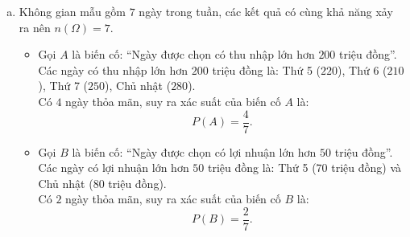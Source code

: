 \begin{bt}
{\begin{enumerate}[a)]
	$$280 - 200 = 80\text{ (triệu đồng)}.$$
	\item Không gian mẫu gồm $7$ ngày trong tuần, các kết quả có cùng khả năng xảy ra nên $n(\Omega) = 7$.
	\begin{itemize}
		\item Gọi $A$ là biến cố: ``Ngày được chọn có thu nhập lớn hơn $200$ triệu đồng''.\\
		Các ngày có thu nhập lớn hơn $200$ triệu đồng là: Thứ 5 ($220$), Thứ 6 ($210$), Thứ 7 ($250$), Chủ nhật ($280$).\\
		Có $4$ ngày thỏa mãn, suy ra xác suất của biến cố $A$ là:
		$$P(A) = \dfrac{4}{7}.$$
		\item Gọi $B$ là biến cố: ``Ngày được chọn có lợi nhuận lớn hơn $50$ triệu đồng''.\\
		Các ngày có lợi nhuận lớn hơn $50$ triệu đồng là: Thứ 5 ($70$ triệu đồng) và Chủ nhật ($80$ triệu đồng).\\
		Có $2$ ngày thỏa mãn, suy ra xác suất của biến cố $B$ là:
		$$P(B) = \dfrac{2}{7}.$$
	\end{itemize}
\end{enumerate}
}
\end{bt}

